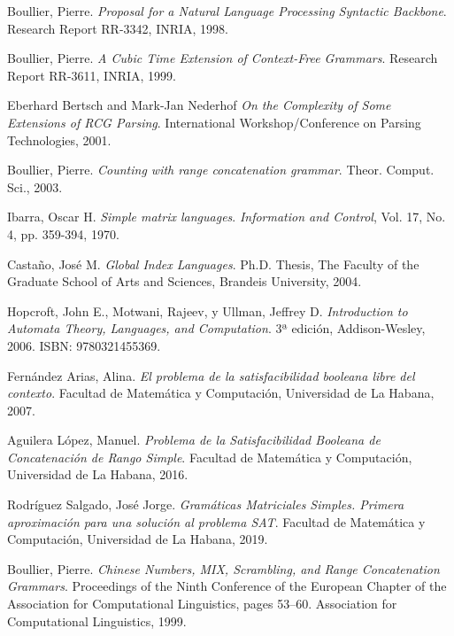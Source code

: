 \documentclass{article}
\begin{document}
\begin{thebibliography}{99}

    Boullier, Pierre.
    \textit{Proposal for a Natural Language Processing Syntactic Backbone}.
    Research Report RR-3342, INRIA, 1998.

    Boullier, Pierre.
    \textit{A Cubic Time Extension of Context-Free Grammars}.
    Research Report RR-3611, INRIA, 1999.

    Eberhard Bertsch and Mark-Jan Nederhof
    \textit{On the Complexity of Some Extensions of RCG Parsing}.
    International Workshop/Conference on Parsing Technologies, 2001.

    Boullier, Pierre.
    \textit{Counting with range concatenation grammar}.
    Theor. Comput. Sci., 2003.

    Ibarra, Oscar H.
    \textit{Simple matrix languages}.
    \textit{Information and Control}, Vol. 17, No. 4, pp. 359-394, 1970.

    Castaño, José M.
    \textit{Global Index Languages}.
    Ph.D. Thesis, The Faculty of the Graduate School of Arts and Sciences, Brandeis University, 2004.

    Hopcroft, John E., Motwani, Rajeev, y Ullman, Jeffrey D.
    \textit{Introduction to Automata Theory, Languages, and Computation}.
    3ª edición, Addison-Wesley, 2006. ISBN: 9780321455369.

    Fernández Arias, Alina.
    \textit{El problema de la satisfacibilidad booleana libre del contexto}.
    Facultad de Matemática y Computación, Universidad de La Habana, 2007.

    Aguilera López, Manuel.
    \textit{Problema de la Satisfacibilidad Booleana de Concatenación de Rango Simple}.
    Facultad de Matemática y Computación, Universidad de La Habana, 2016.

    Rodríguez Salgado, José Jorge.
    \textit{Gramáticas Matriciales Simples. Primera aproximación para una solución al problema SAT}.
    Facultad de Matemática y Computación, Universidad de La Habana, 2019.

    Boullier, Pierre.
    \textit{Chinese Numbers, MIX, Scrambling, and Range Concatenation Grammars}.
    Proceedings of the Ninth Conference of the European Chapter of the Association for Computational Linguistics, pages 53--60. Association for Computational Linguistics, 1999.

\end{thebibliography}
\end{document}
